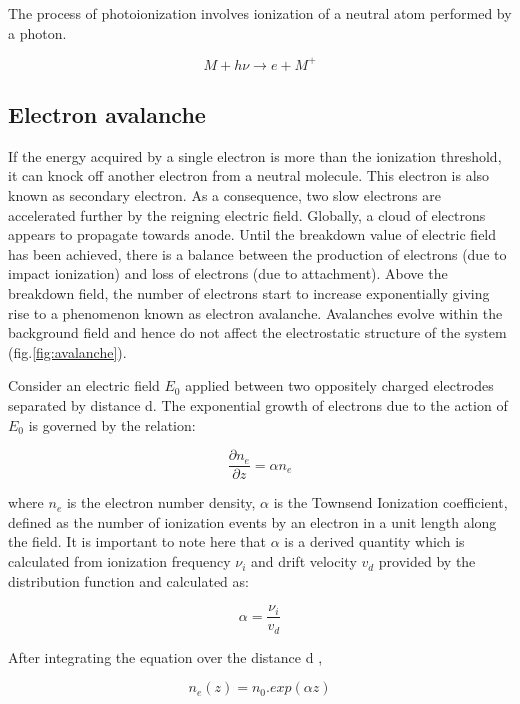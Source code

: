 \documentclass[paper=a4, fontsize=13pt]{scrartcl}
\begin{document}
The process of photoionization involves ionization of a neutral atom performed by a photon.

\begin{equation}
M + h\nu \rightarrow e + M^+ 
\end{equation}

\subsection{Electron avalanche}

If the energy acquired by a single electron is more than the ionization threshold, it can knock off another electron from a neutral molecule. This electron is also known as secondary electron. As a consequence, two slow electrons are accelerated further by the reigning electric field. Globally, a cloud of electrons appears to propagate towards anode. Until the breakdown value of electric field has been achieved, there is a balance between the production of electrons (due to impact ionization) and loss of electrons (due to attachment). Above the breakdown field, the number of electrons start to increase exponentially giving rise to a phenomenon known as electron avalanche. Avalanches evolve within the background field and hence do not affect the electrostatic structure of the system (fig.\ref{fig:avalanche}). 


Consider an electric field $E_0$ applied between two oppositely charged electrodes separated by distance d. The exponential growth of electrons due to the action of $E_0$ is governed by the relation:

\begin{equation}
\frac{\partial n_e}{\partial z} = \alpha n_e
\end{equation}

where $n_e$ is the electron number density, $\alpha$ is the Townsend Ionization coefficient, defined as the number of ionization events by an electron in a unit length along the field.  It is important to note here that $\alpha$ is a derived quantity which is calculated from ionization frequency $\nu_i$ and drift velocity $v_d$ provided by the distribution function and calculated as:

\begin{equation}
\alpha = \frac{\nu_i}{v_d}
\end{equation}

After integrating the equation over the distance d ,

\begin{equation}
n_e(z) = n_0. exp (\alpha z)
\end{equation}
\end{document}
